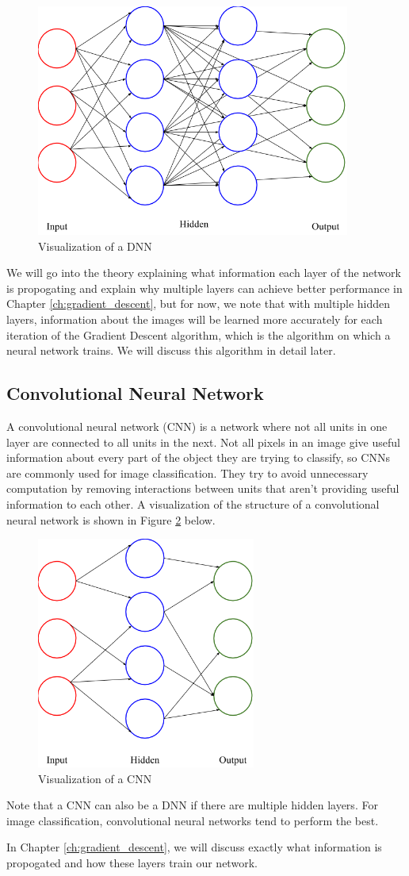 \begin{figure}[ht!]
\centering
\includegraphics[height=3in]{../figures/deep_nn.png}
\caption{Visualization of a DNN}
\label{fig:dnn}
\end{figure}

We will go into the theory explaining what information each layer of the
network is propogating and explain why multiple layers can achieve better
performance in Chapter \ref{ch:gradient_descent}, but for now, we note that
with multiple hidden layers, information about the images will be learned more
accurately for each iteration of the Gradient Descent algorithm, which is the
algorithm on which a neural network trains. We will discuss this algorithm in
detail later.

\subsection{Convolutional Neural Network}
A convolutional neural network (CNN) is a network where not all units in one
layer are connected to all units in the next. Not all pixels in an image give
useful information about every part of the object they are trying to classify,
so CNNs are commonly used for image classification. They try to avoid
unnecessary computation by removing interactions between units that aren't
providing useful information to each other. A visualization of the structure
of a convolutional neural network is shown in Figure \ref{fig:cnn} below.
\newpage
\begin{figure}[ht!]
\centering
\includegraphics[height=3in]{../figures/convolutional_nn.png}
\caption{Visualization of a CNN}
\label{fig:cnn}
\end{figure}

Note that a CNN can also be a DNN if there are multiple hidden layers. For
image classification, convolutional neural networks tend to perform the best.

\noindent In Chapter \ref{ch:gradient_descent}, we will discuss exactly what
information is propogated and how these layers train our network.
